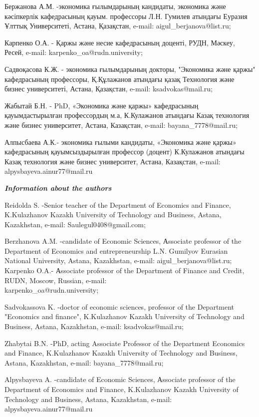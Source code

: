 Бержанова А.М. -экономика ғылымдарының кандидаты, экономика және
кәсіпкерлік кафедрасының қауым. профессоры Л.Н. Гумилев атындағы Еуразия
Ұлттық Университеті, Астана, Қазақстан, e-mail:
aigul\_berjanova@list.ru;

Карпенко О.А. - Қаржы және несие кафедрасының доценті, РУДН, Мәскеу,
Ресей, e-mail: karpenko\_oa@rudn.university;

Садвоқасова К.Ж. - экономика ғылымдарының докторы, "Экономика және
қаржы" кафедрасының профессоры, Қ.Құлажанов атындағы қазақ Технология
және бизнес университеті, Астана, Қазақстан, e-mail: ksadvokas@mail.ru;

Жабытай Б.Н. - PhD, «Экономика және қаржы» кафедрасының қауымдастырылған
профессордың м.а, К.Кулажанов атындағы Казақ технология және бизнес
университет, Астана, Казақстан, e-mail: bayana\_7778@mail.ru;

Алпысбаева А.К.- экономика ғылыми кандидаты, «Экономика және қаржы»
кафедрасының қауымсыздырылған профессор (доцент) К.Кулажанов атындағы
Казақ технология және бизнес университет, Астана, Казақстан, e-mail:
alpysbayeva.ainur77@mail.ru

\emph{{\bfseries Information about the authors}}

Reidolda S. -Senior teacher of the Department of Economics and Finance,
K.Kulazhanov Kazakh University of Technology and Business, Astana,
Kazakhstan, e-mail: Saulegul0408@gmail.com;

Berzhanova A.M. -candidate of Economic Sciences, Аssociate professor of
the Department of Economics and entrepreneurship L.N. Gumilyov Eurasian
National University, Astana, Kazakhstan, e-mail:
aigul\_berjanova@list.ru; Karpenko O.A.- Аssociate professor of the
Department of Finance and Credit, RUDN, Moscow, Russian, e-mail:\\
karpenko\_oa@rudn.university;

Sadvokassova K. -doctor of economic sciences, professor of the
Department "Economics and finance", K.Kulazhanov Kazakh University of
Technology and Business, Astana, Kazakhstan, e-mail: ksadvokas@mail.ru;

Zhabytai B.N. -PhD, acting Associate Professor of the Department
Economics and Finance, K.Kulazhanov Kazakh University of Technology and
Business, Astana, Kazakhstan, e-mail: bayana\_7778@mail.ru;

Alpysbayeva A. -candidate of Economic Sciences, Аssociate professor of
the Department of Economics and Finance, K.Kulazhanov Kazakh University
of Technology and Business, Astana, Kazakhstan, e-mail:
alpysbayeva.ainur77@mail.ru















